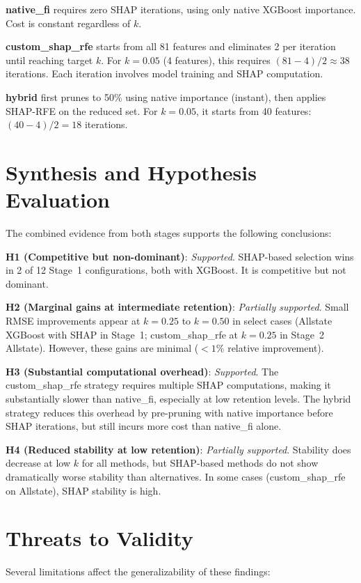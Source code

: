 \textbf{native\_fi} requires zero SHAP iterations, using only native XGBoost importance. Cost is constant regardless of $k$.

\textbf{custom\_shap\_rfe} starts from all 81 features and eliminates 2 per iteration until reaching target $k$. For $k=0.05$ (4 features), this requires $(81-4)/2 \approx 38$ iterations. Each iteration involves model training and SHAP computation.

\textbf{hybrid} first prunes to 50\% using native importance (instant), then applies SHAP-RFE on the reduced set. For $k=0.05$, it starts from 40 features: $(40-4)/2 = 18$ iterations.

\section{Synthesis and Hypothesis Evaluation}

The combined evidence from both stages supports the following conclusions:

\textbf{H1 (Competitive but non-dominant)}: \textit{Supported}. SHAP-based selection wins in 2 of 12 Stage~1 configurations, both with XGBoost. It is competitive but not dominant.

\textbf{H2 (Marginal gains at intermediate retention)}: \textit{Partially supported}. Small RMSE improvements appear at $k=0.25$ to $k=0.50$ in select cases (Allstate XGBoost with SHAP in Stage~1; custom\_shap\_rfe at $k=0.25$ in Stage~2 Allstate). However, these gains are minimal ($<1\%$ relative improvement).

\textbf{H3 (Substantial computational overhead)}: \textit{Supported}. The custom\_shap\_rfe strategy requires multiple SHAP computations, making it substantially slower than native\_fi, especially at low retention levels. The hybrid strategy reduces this overhead by pre-pruning with native importance before SHAP iterations, but still incurs more cost than native\_fi alone.

\textbf{H4 (Reduced stability at low retention)}: \textit{Partially supported}. Stability does decrease at low $k$ for all methods, but SHAP-based methods do not show dramatically worse stability than alternatives. In some cases (custom\_shap\_rfe on Allstate), SHAP stability is high.

\section{Threats to Validity}

Several limitations affect the generalizability of these findings:

